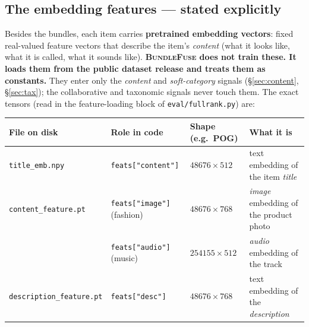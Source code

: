 \documentclass[11pt]{article}
\theoremstyle{remark}
\newcommand{\code}[1]{\texttt{\small #1}}
\begin{document}
\label{fig:graph}

\subsection{The embedding features --- stated explicitly}
\label{sec:emb}

Besides the bundles, each item carries \textbf{pretrained embedding vectors}: fixed real-valued feature vectors that
describe the item's \emph{content} (what it looks like, what it is called, what it sounds like). \textbf{\textsc{BundleFuse}
does not train these. It loads them from the public dataset release and treats them as constants.} They enter only
the \emph{content} and \emph{soft-category} signals (\S\ref{sec:content},\,\S\ref{sec:tax}); the collaborative and
taxonomic signals never touch them. The exact tensors (read in the feature-loading block of \code{eval/fullrank.py}) are:

\begin{center}\small
\begin{tabular}{@{}l l l l@{}}
\toprule
File on disk & Role in code & Shape (e.g.\ \textsc{POG}) & What it is \\
\midrule
\code{title\_emb.npy} & \code{feats["content"]} & $48676\times 512$ & text embedding of the item \emph{title} \\
\code{content\_feature.pt} & \code{feats["image"]} (fashion) & $48676\times 768$ & \emph{image} embedding of the product photo \\
                           & \code{feats["audio"]} (music) & $254155\times 512$ & \emph{audio} embedding of the track \\
\code{description\_feature.pt} & \code{feats["desc"]} & $48676\times 768$ & text embedding of the \emph{description} \\
\bottomrule
\end{tabular}
\end{center}
\end{document}
